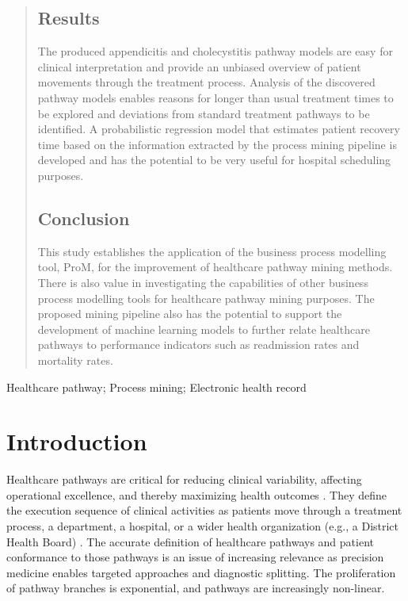 \documentclass{elsarticle}
\begin{document}
\begin{frontmatter}
\begin{abstract}
\subsection*{Results}
The produced appendicitis and cholecystitis pathway models are easy for clinical interpretation and provide an unbiased overview of patient movements through the treatment process. Analysis of the discovered pathway models enables reasons for longer than usual treatment times to be explored and deviations from standard treatment pathways to be identified. A probabilistic regression model that estimates patient recovery time based on the information extracted by the process mining pipeline is developed and has the potential to be very useful for hospital scheduling purposes.

\subsection*{Conclusion}
This study establishes the application of the business process modelling tool, ProM, for the improvement of healthcare pathway mining methods. There is also value in investigating the capabilities of other business process modelling tools for healthcare pathway mining purposes. The proposed mining pipeline also has the potential to support the development of machine learning models to further relate healthcare pathways to performance indicators such as readmission rates and mortality rates. 

\end{abstract}

\begin{keyword}
Healthcare pathway; Process mining; Electronic health record
\end{keyword}

\end{frontmatter}

\linenumbers

\section{Introduction}
Healthcare pathways are critical for reducing clinical variability, affecting operational excellence, and thereby maximizing health outcomes \cite{Lin2001}. They define the execution sequence of clinical activities as patients move through a treatment process, a department, a hospital, or a wider health organization (e.g., a District Health Board) \cite{Huang2016}. The accurate definition of healthcare pathways and patient conformance to those pathways is an issue of increasing relevance as precision medicine enables targeted approaches and diagnostic splitting. The proliferation of pathway branches is exponential, and pathways are increasingly non-linear. 
\end{document}
